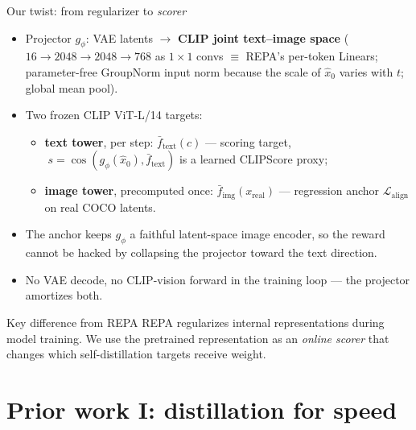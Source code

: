 \documentclass[aspectratio=169,10pt]{beamer}
\newcommand{\cossim}{\operatorname{cos}}
\newcommand{\xhat}{\hat{x}_0}
\newcommand{\ftext}{\bar{f}_{\mathrm{text}}}
\newcommand{\fimg}{\bar{f}_{\mathrm{img}}}
\begin{document}
\begin{frame}{Our twist: from regularizer to \emph{scorer}}
  \begin{itemize}
    \item Projector $g_\phi$: VAE latents $\to$ \textbf{CLIP joint
      text--image space} ($16 \to 2048 \to 2048 \to 768$ as $1{\times}1$ convs
      $\equiv$ REPA's per-token Linears; parameter-free GroupNorm input norm
      because the scale of $\xhat$ varies with $t$; global mean pool).
    \item Two frozen CLIP ViT-L/14 targets:
      \begin{itemize}
        \item \textbf{text tower}, per step: $\ftext(c)$ --- scoring target,
          $\;s = \cossim(g_\phi(\xhat), \ftext)$ is a \alert{learned CLIPScore
          proxy};
        \item \textbf{image tower}, precomputed once: $\fimg(x_{\mathrm{real}})$
          --- regression anchor $\mathcal{L}_{\mathrm{align}}$ on real COCO
          latents.
      \end{itemize}
    \item The anchor keeps $g_\phi$ a faithful latent-space image encoder, so
      the reward cannot be hacked by collapsing the projector toward the text
      direction.
    \item No VAE decode, no CLIP-vision forward in the training loop --- the
      projector amortizes both.
  \end{itemize}
  \begin{alertblock}{Key difference from REPA}
    REPA regularizes internal representations during model training. We use the
    pretrained representation as an \emph{online scorer} that changes which
    self-distillation targets receive weight.
  \end{alertblock}
\end{frame}

\section{Prior work I: distillation for speed}
\end{document}
